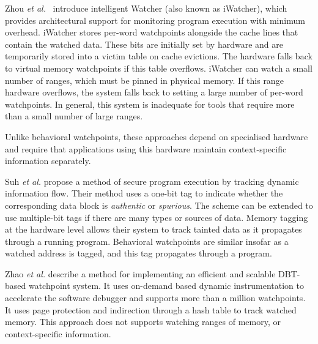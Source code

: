 Zhou \emph{et al.}~\cite{Zhou:2004:IEA:998680.1006720} introduce intelligent Watcher (also known as iWatcher), which provides architectural support for monitoring program execution with minimum overhead. iWatcher stores per-word watchpoints alongside the cache lines that contain the watched data. These bits are initially set by hardware and are temporarily stored into a victim table on cache evictions. The hardware falls back to virtual memory watchpoints if this table overflows. iWatcher can watch a small number of ranges, which must be pinned in physical memory. If this range hardware overflows, the system falls back to setting a large number of per-word watchpoints. In general, this system is inadequate for tools that require more than a small number of large ranges.

Unlike behavioral watchpoints, these approaches depend on specialised hardware and require that applications using this hardware maintain context-specific information separately. 


Suh \emph{et al.} \cite{SecureProgramExecFlowTracking} propose a method of secure program execution by tracking dynamic information flow. Their method uses a one-bit tag to indicate whether the corresponding data block is \emph{authentic} or \emph{spurious}. The scheme can be extended to use multiple-bit tags if there are many types or sources of data.
Memory tagging at the hardware level allows their system to track tainted data as it propagates through a running program. Behavioral watchpoints are similar insofar as a watched address is tagged, and this tag propagates through a program.




Zhao \emph{et al.} \cite{DynamoRIOWatchpoints} describe a method for implementing an efficient and scalable DBT-based watchpoint system. It uses on-demand based dynamic instrumentation to accelerate the software debugger and supports more than a million watchpoints. It uses page protection and indirection through a hash table to track watched memory. This approach does not supports watching ranges of memory, or context-specific information. 



